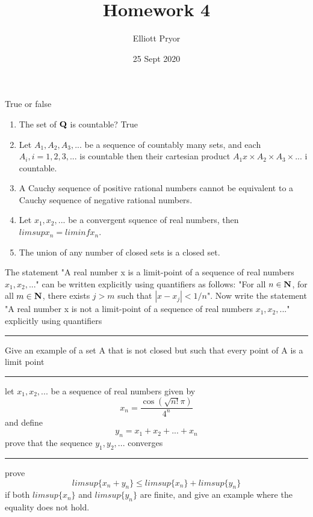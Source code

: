 \documentclass[11pt]{article}
\title{Homework 4}
\author{Elliott Pryor}
\date{25 Sept 2020}
\begin{document}
\maketitle

True or false

\begin{enumerate}
	\item The set of $\mathbf{Q}$ is countable? True
	\item Let $A_1, A_2, A_3, ...$ be a sequence of countably many sets, and each $A_i, i = 1,2,3,...$ is countable then their cartesian product $A_1 x \times A_2 \times A_3 \times ...$ i countable.
	\item A Cauchy sequence of positive rational numbers cannot be equivalent to a Cauchy sequence of negative rational numbers.
	
	\item Let $x_1, x_2, ...$ be a convergent squence of real numbers, then $limsup x_n = liminf x_n$.
	
	\item The union of any number of closed sets is a closed set.
\end{enumerate}


The statement "A real number x is a limit-point of a sequence of real numbers $x_1, x_2, . . .$"
can be written explicitly using quantifiers as follows: "For all $n \in \mathbf{N}$, for all $m \in \mathbf{N}$, there
exists $j > m$ such that $|x - x_j| < 1/n$". Now write the statement "A real number x is
not a limit-point of a sequence of real numbers $x_1, x_2, ...$" explicitly using quantifiers
\hrule



Give an example of a set A that is not closed but such that every point of A is a limit point
\hrule




let $x_1, x_2, ...$ be a sequence of real numbers given by
$$x_n = \frac{\cos(\sqrt{n!}\pi)}{4^n}$$
and define
$$y_n = x_1 + x_2 + ... + x_n$$
prove that the sequence $y_1, y_2, ...$ converges
\hrule





prove
$$limsup\{x_n + y_n\} \leq limsup\{x_n\} + limsup\{y_n\}$$
if both $limsup\{x_n\}$ and $limsup\{y_n\}$ are finite, and give an example where the equality does not hold.
\end{document}
